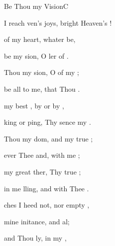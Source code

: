 \documentclass[12pt]{book}
\begin{document}
\begin{song}{Be Thou my Vision}{C}
\begin{SBVerse}
     I reach ven's joys, 
         bright Heaven's !

     of my  heart, 
        whater be,

     be my sion, 
        O ler of .

    \Ch{[Interlude:}{}    \Ch{D]}{}
  \end{SBVerse}

  \begin{SBExtraKeys}{
  \CBPageBrk

  \begin{SBVerse}
     Thou my sion, 
        O  of my ;

     be all  to me, 
         that Thou .

     my best , 
        by  or by ,

    king or ping, 
        Thy sence my .

    \Ch{[Interlude:}{}    \Ch{G]}{}
  \end{SBVerse}

  \begin{SBVerse}
     Thou my dom, 
        and  my true ;

     ever  Thee and, 
         with me ;

     my great ther, 
         Thy true ;

     in me lling, 
        and  with Thee .

    \Ch{[Interlude:}{}    \Ch{G]}{}
  \end{SBVerse}


  \begin{SBVerse}
    ches I heed  not, 
        nor  empty ,

     mine initance, 
         and al;

     and Thou ly, 
         in my ,


\end{SBVerse}}
\end{SBExtraKeys}
\end{song}
\end{document}
